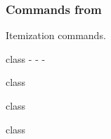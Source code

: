 \documentclass{skdoc}
\begin{document}
	\subsubsection{Commands from }
	Itemization commands.
\begin{MacroCode}{class}
\setlength\leftmargini{2em}
\leftmargin\leftmargini
\setlength\leftmarginii{2em}
\setlength\leftmarginiii{1.5em}
\setlength\leftmarginiv{1.5em}
\setlength\leftmarginv{1em}
\setlength\leftmarginvi{1em}
\setlength{}
\setlength{}
\addtolength{}
\@beginparpenalty -\@lowpenalty
\@endparpenalty   -\@lowpenalty
\@itempenalty     -\@lowpenalty
\end{MacroCode}
	\begin{macro*}{\theenumi}
	\begin{macro*}{\theenumii}
	\begin{macro*}{\theenumiii}
	\begin{macro*}{\theenumiv}
\begin{MacroCode}{class}
\renewcommand\theenumi{\@arabic\c@enumi}
\renewcommand\theenumii{\@alph\c@enumii}
\renewcommand\theenumiii{\@roman\c@enumiii}
\renewcommand\theenumiv{\@Alph\c@enumiv}
\end{MacroCode}
	\end{macro*}
	\end{macro*}
	\end{macro*}
	\end{macro*}
	\begin{macro*}{}
	\begin{macro*}{}
	\begin{macro*}{}
	\begin{macro*}{}
\begin{MacroCode}{class}
\newcommand\labelenumi{\theenumi.}
\newcommand\labelenumii{\theenumii)}
\newcommand\labelenumiii{\theenumiii.}
\newcommand\labelenumiv{\theenumiv.}
\end{MacroCode}
	\end{macro*}
	\end{macro*}
	\end{macro*}
	\end{macro*}
	\begin{macro*}{\p@enumii}
	\begin{macro*}{\p@enumiii}
	\begin{macro*}{\p@enumiiv}
\begin{MacroCode}{class}
\renewcommand\p@enumii{\theenumi}
\renewcommand\p@enumiii{\theenumi(\theenumii)}
\renewcommand\p@enumiv{\p@enumiii\theenumiii}
\end{MacroCode}
	\end{macro*}
	\end{macro*}
	\end{macro*}
\end{document}
